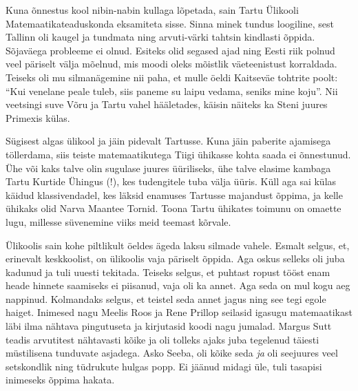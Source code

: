 Kuna õnnestus kool nibin-nabin kullaga lõpetada, sain Tartu Ülikooli 
Matemaatikateaduskonda eksamiteta 
sisse. Sinna minek tundus loogiline, sest Tallinn oli kaugel ja tundmata ning 
arvuti-värki tahtsin kindlasti õppida. Sõjaväega probleeme ei olnud. Esiteks 
olid segased ajad ning Eesti riik polnud veel päriselt välja mõelnud, mis moodi 
oleks mõistlik väeteenistust korraldada. Teiseks oli mu silmanägemine nii paha, 
et mulle öeldi Kaitseväe tohtrite poolt: \enquote{Kui venelane peale tuleb, 
siis paneme su laipu vedama, seniks mine koju}. Nii veetsingi suve Võru ja 
Tartu vahel hääletades, käisin näiteks ka Steni 
juures 
Primexis külas. 

Sügisest algas ülikool ja jäin pidevalt Tartusse. Kuna jäin paberite ajamisega 
töllerdama, siis teiste matemaatikutega Tiigi ühikasse kohta saada ei 
õnnestunud. Ühe või kaks talve olin sugulase juures üüriliseks, ühe talve 
elasime kambaga Tartu Kurtide Ühingus (!), kes 
tudengitele tuba välja üüris. Küll aga sai külas käidud klassivendadel, kes 
läksid enamuses Tartusse majandust õppima, ja kelle ühikaks olid Narva Maantee 
Tornid. Toona Tartu ühikates toimunu on omaette lugu, millesse süvenemine viiks 
meid teemast kõrvale.

Ülikoolis sain kohe piltlikult öeldes ägeda laksu silmade vahele. Esmalt 
selgus, et, erinevalt keskkoolist, on ülikoolis vaja päriselt õppida. Aga oskus 
selleks oli juba kadunud ja tuli uuesti tekitada. Teiseks selgus, et puhtast 
ropust tööst enam heade hinnete saamiseks ei piisanud, vaja oli ka annet. Aga 
seda on mul kogu aeg nappinud. Kolmandaks selgus, et teistel seda annet jagus 
ning see tegi egole haiget. Inimesed nagu Meelis Roos 
ja Rene Prillop seilasid igasugu matemaatikast läbi 
ilma nähtava pingutuseta ja kirjutasid koodi nagu jumalad. Margus 
Sutt teadis arvutitest nähtavasti kõike ja oli tolleks 
ajaks juba tegelenud täiesti müstilisena tunduvate asjadega. Asko 
Seeba, oli kõike seda \emph{ja} oli seejuures veel 
setskondlik ning tüdrukute hulgas popp. Ei jäänud midagi üle, tuli tasapisi 
inimeseks õppima hakata. 

